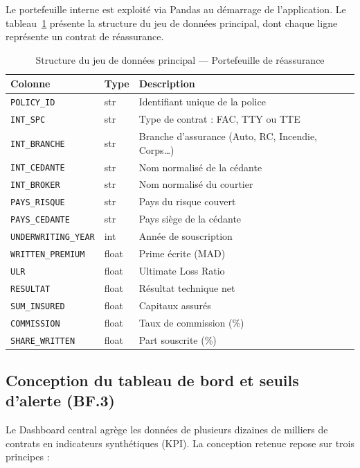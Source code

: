\documentclass[12pt,a4paper]{report}
\begin{document}
Le portefeuille interne est exploité via Pandas au démarrage de l'application. Le tableau~\ref{tab:dataset_structure} présente la structure du jeu de données principal, dont chaque ligne représente un contrat de réassurance.

\begin{table}[H]
\centering
\caption{Structure du jeu de données principal --- Portefeuille de réassurance}
\label{tab:dataset_structure}
\small
\begin{tabularx}{\textwidth}{@{}p{3.8cm}p{2cm}X@{}}
\toprule
\textbf{Colonne} & \textbf{Type} & \textbf{Description} \\
\midrule
\texttt{POLICY\_ID}       & str    & Identifiant unique de la police \\
\texttt{INT\_SPC}         & str    & Type de contrat : FAC, TTY ou TTE \\
\texttt{INT\_BRANCHE}     & str    & Branche d'assurance (Auto, RC, Incendie, Corps\ldots) \\
\texttt{INT\_CEDANTE}     & str    & Nom normalisé de la cédante \\
\texttt{INT\_BROKER}      & str    & Nom normalisé du courtier \\
\texttt{PAYS\_RISQUE}     & str    & Pays du risque couvert \\
\texttt{PAYS\_CEDANTE}    & str    & Pays siège de la cédante \\
\texttt{UNDERWRITING\_YEAR}& int   & Année de souscription \\
\texttt{WRITTEN\_PREMIUM} & float  & Prime écrite (MAD) \\
\texttt{ULR}              & float  & Ultimate Loss Ratio \\
\texttt{RESULTAT}         & float  & Résultat technique net \\
\texttt{SUM\_INSURED}     & float  & Capitaux assurés \\
\texttt{COMMISSION}       & float  & Taux de commission (\%) \\
\texttt{SHARE\_WRITTEN}   & float  & Part souscrite (\%) \\
\bottomrule
\end{tabularx}
\end{table}

\subsection{Conception du tableau de bord et seuils d'alerte (BF.3)}

Le Dashboard central agrège les données de plusieurs dizaines de milliers de contrats en indicateurs synthétiques (KPI). La conception retenue repose sur trois principes :
\end{document}

